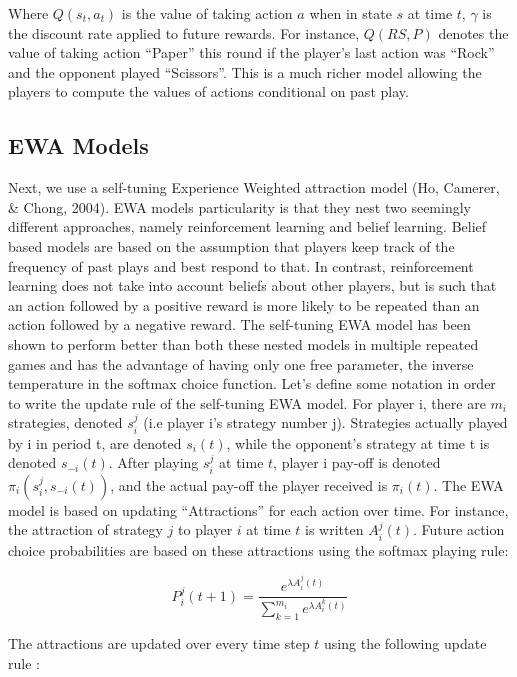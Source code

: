 \documentclass[man,floatsintext]{apa6}
\begin{document}
Where \(Q(s_{t},a_{t})\) is the value of taking action \(a\) when in state \(s\) at time \(t\), \(\gamma\) is the discount rate applied to future rewards. For instance, \(Q(RS,P)\) denotes the value of taking action \enquote{Paper} this round if the player's last action was \enquote{Rock} and the opponent played \enquote{Scissors}. This is a much richer model allowing the players to compute the values of actions conditional on past play.

\hypertarget{ewa-models}{%
\subsection{EWA Models}\label{ewa-models}}

Next, we use a self-tuning Experience Weighted attraction model (Ho, Camerer, \& Chong, 2004). EWA models particularity is that they nest two seemingly different approaches, namely reinforcement learning and belief learning. Belief based models are based on the assumption that players keep track of the frequency of past plays and best respond to that. In contrast, reinforcement learning does not take into account beliefs about other players, but is such that an action followed by a positive reward is more likely to be repeated than an action followed by a negative reward. The self-tuning EWA model has been shown to perform better than both these nested models in multiple repeated games and has the advantage of having only one free parameter, the inverse temperature in the softmax choice function.
Let's define some notation in order to write the update rule of the self-tuning EWA model. For player i, there are \(m_{i}\) strategies, denoted \(s_{i}^{j}\) (i.e player i's strategy number j). Strategies actually played by i in period t, are denoted \(s_{i}(t)\), while the opponent's strategy at time t is denoted \(s_{-i}(t)\). After playing \(s_{i}^{j}\) at time \(t\), player i pay-off is denoted \(\pi_{i}(s_{i}^{j},s_{-i}(t))\), and the actual pay-off the player received is \(\pi_{i}(t)\).
The EWA model is based on updating \enquote{Attractions} for each action over time. For instance, the attraction of strategy \(j\) to player \(i\) at time \(t\) is written \(A_{i}^{j}(t)\). Future action choice probabilities are based on these attractions using the softmax playing rule:

\[P_{i}^{j}(t+1) = \frac{e^{\lambda  A_{i}^{j}(t)}}{\sum_{k=1}^{m_{i}}e^{\lambda A_{i}^{k}(t)}} \]

The attractions are updated over every time step \(t\) using the following update rule :
\end{document}
